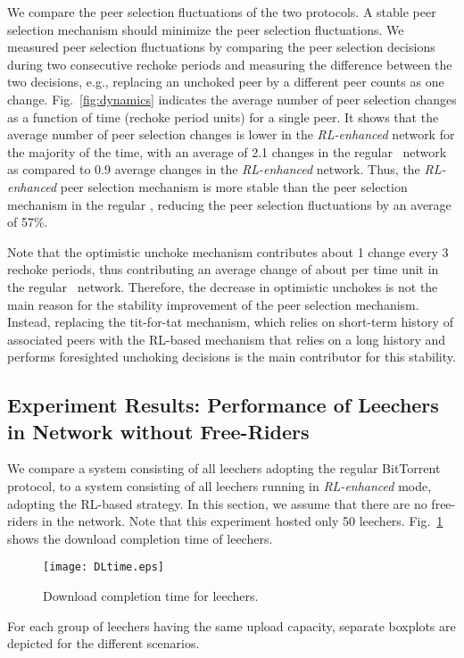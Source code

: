 We compare the peer selection fluctuations of the two protocols.
A stable peer selection mechanism should minimize the peer selection 
fluctuations. We measured peer selection fluctuations by comparing the peer 
selection decisions during two consecutive rechoke periods and measuring the 
difference between the two decisions, e.g., replacing an unchoked peer by a 
different peer counts as one change.
Fig.~\ref{fig:dynamics} indicates the average number of peer selection 
changes as a function of time (rechoke period units) for a single peer. 
It shows that the average number of peer selection changes is lower in the 
\emph{RL-enhanced} network for the majority of the time, with an average of 2.1 
changes in the regular \BT~network as compared to 0.9 average changes in the 
\emph{RL-enhanced} network. Thus, the \emph{RL-enhanced} peer selection 
mechanism is more stable than the peer selection mechanism in the regular \BT, reducing the peer selection fluctuations by an average of 57\%.

Note that the optimistic unchoke mechanism contributes about 1 change 
every 3 rechoke periods, thus contributing an average change of about 
 per time unit in the regular \BT~network. Therefore, the decrease 
in optimistic unchokes is not the main reason for the stability improvement of 
the peer selection mechanism. 
Instead, replacing the tit-for-tat mechanism, which relies on short-term 
history of associated peers with the RL-based mechanism that 
relies on a long history and performs foresighted unchoking decisions is the 
main contributor for this stability.

\subsection{Experiment Results: Performance of Leechers in Network without
Free-Riders}


We compare a system consisting of all leechers adopting the regular BitTorrent 
protocol, to a system consisting of all leechers running in \emph{RL-enhanced} mode, adopting the RL-based strategy.  
In this section, we assume that there are no free-riders in the network. 
Note that this experiment hosted only 50 leechers. 
Fig.~\ref{fig:DLtime} shows the download completion time of leechers.
\begin{figure}[t]
\centering
\texttt{[image: DLtime.eps]}
\caption{Download completion time for leechers.} 
\label{fig:DLtime}
\end{figure}
For each group of leechers having the same upload capacity, separate boxplots 
are depicted for the different scenarios.


